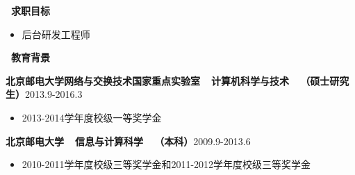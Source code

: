 ﻿\documentclass[UTF8, winfonts]{ctexart}
\begin{document}
\noindent \textbf{ \heiti \faSearch\ 求职目标}
\begin{itemize}
  \item {}后台研发工程师
\end{itemize}
\noindent \textbf{ \heiti \faGraduationCap\ 教育背景}\par
\vspace{1.3ex}
\indent \textbf{北京邮电大学网络与交换技术国家重点实验室~~计算机科学与技术~~（硕士研究生）}\hfill {}2013.9-2016.3
\begin{itemize}
  \item {}2013-2014学年度校级一等奖学金
\end{itemize}\par
\indent \textbf{北京邮电大学~~信息与计算科学~~（本科）}\hfill {}2009.9-2013.6
\begin{itemize}
  \item {}2010-2011学年度校级三等奖学金和2011-2012学年度校级三等奖学金
\end{itemize}
\end{document}
